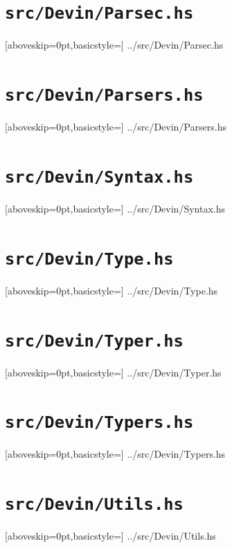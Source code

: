 \documentclass[UdineBachThesis,american,11pt,draft]{PhdThesis}
\begin{document}
  \section{\texttt{src/Devin/Parsec.hs}}

  
    [aboveskip=0pt,basicstyle=\ttfamily\footnotesize]
    {../src/Devin/Parsec.hs}

  \section{\texttt{src/Devin/Parsers.hs}}

  
    [aboveskip=0pt,basicstyle=\ttfamily\footnotesize]
    {../src/Devin/Parsers.hs}

  \section{\texttt{src/Devin/Syntax.hs}}

  
    [aboveskip=0pt,basicstyle=\ttfamily\footnotesize]
    {../src/Devin/Syntax.hs}

  \section{\texttt{src/Devin/Type.hs}}

  
    [aboveskip=0pt,basicstyle=\ttfamily\footnotesize]
    {../src/Devin/Type.hs}

  \section{\texttt{src/Devin/Typer.hs}}

  
    [aboveskip=0pt,basicstyle=\ttfamily\footnotesize]
    {../src/Devin/Typer.hs}

  \section{\texttt{src/Devin/Typers.hs}}

  
    [aboveskip=0pt,basicstyle=\ttfamily\footnotesize]
    {../src/Devin/Typers.hs}

  \section{\texttt{src/Devin/Utils.hs}}

  
    [aboveskip=0pt,basicstyle=\ttfamily\footnotesize]
    {../src/Devin/Utils.hs}
\end{document}
